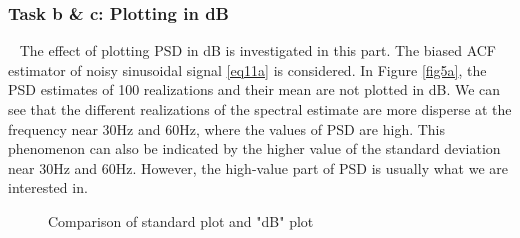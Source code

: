 \documentclass[10pt]{article}
\begin{document}
\subsubsection{Task b \& c: Plotting in dB}
\ \indent
The effect of plotting PSD in dB is investigated in this part. The biased 
ACF estimator of noisy sinusoidal signal \eqref{eq11a} is considered. In Figure \ref{fig5a}, 
the PSD estimates of 100 realizations and their mean are not plotted in dB. 
We can see that the different realizations of the spectral estimate are 
more disperse at the frequency near 30Hz and 60Hz, where the values of 
PSD are high. This phenomenon can also be indicated by the higher value 
of the standard deviation near 30Hz and 60Hz. However, the high-value part 
of PSD is usually what we are interested in.

\begin{figure}[htbp]
    \centering
    \caption{Comparison of standard plot and "dB" plot}
    \label{fig5}
\end{figure}
\end{document}
